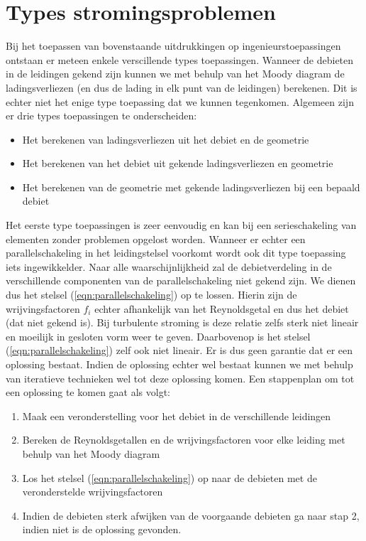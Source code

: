 	\section{Types stromingsproblemen}
	\label{sec:types stromingsproblemen}
Bij het toepassen van bovenstaande uitdrukkingen op ingenieurstoepassingen ontstaan er meteen enkele verscillende types toepassingen. Wanneer de debieten in de leidingen gekend zijn kunnen we met behulp van het Moody diagram de ladingsverliezen (en dus de lading in elk punt van de leidingen) berekenen. Dit is echter niet het enige type toepassing dat we kunnen tegenkomen. Algemeen zijn er drie types toepassingen te onderscheiden:
\begin{itemize}
	\item Het berekenen van ladingsverliezen uit het debiet en de geometrie
	\item Het berekenen van het debiet uit gekende ladingsverliezen en geometrie
	\item Het berekenen van de geometrie met gekende ladingsverliezen bij een bepaald debiet
\end{itemize}
Het eerste type toepassingen is zeer eenvoudig en kan bij een serieschakeling van elementen zonder problemen opgelost worden. Wanneer er echter een parallelschakeling in het leidingstelsel voorkomt wordt ook dit type toepassing iets ingewikkelder. Naar alle waarschijnlijkheid zal de debietverdeling in de verschillende componenten van de parallelschakeling niet gekend zijn. We dienen dus het stelsel (\ref{eqn:parallelschakeling}) op te lossen. Hierin zijn de wrijvingsfactoren $f_i$ echter afhankelijk van het Reynoldsgetal en dus het debiet (dat niet gekend is). Bij turbulente stroming is deze relatie zelfs sterk niet lineair en moeilijk in gesloten vorm weer te geven. Daarbovenop is het stelsel (\ref{eqn:parallelschakeling}) zelf ook niet lineair. Er is dus geen garantie dat er een oplossing bestaat.
Indien de oplossing echter wel bestaat kunnen we met behulp van iteratieve technieken wel tot deze oplossing komen. Een stappenplan om tot een oplossing te komen gaat als volgt:
\begin{enumerate}
	\item Maak een veronderstelling voor het debiet in de verschillende leidingen
	\item Bereken de Reynoldsgetallen en de wrijvingsfactoren voor elke leiding met behulp van het Moody diagram
	\item Los het stelsel (\ref{eqn:parallelschakeling}) op naar de debieten met de veronderstelde wrijvingsfactoren
	\item Indien de debieten sterk afwijken van de voorgaande debieten ga naar stap 2, indien niet is de oplossing gevonden.
\end{enumerate}

